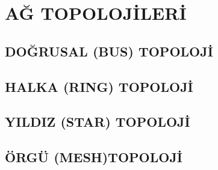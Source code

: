 \section{AĞ TOPOLOJİLERİ}

\subsection{DOĞRUSAL (BUS) TOPOLOJİ}

\subsection{HALKA (RING) TOPOLOJİ}

\subsection{YILDIZ (STAR) TOPOLOJİ}

\subsection{ÖRGÜ (MESH)TOPOLOJİ}

